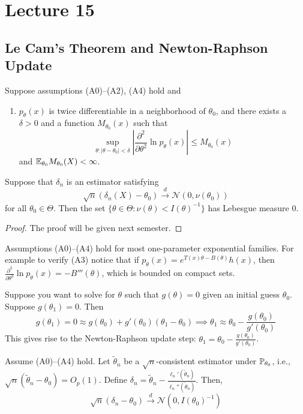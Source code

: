 \section{Lecture 15}

\subsection{Le Cam's Theorem and Newton-Raphson Update}

\begin{theorem}
	Suppose assumptions (A0)--(A2), (A4) hold and
	\begin{enumerate}
		\item[(A3)$''$] $p_\theta(x)$ is twice differentiable in a neighborhood of $\theta_0$, and there exists a $\delta > 0$ and a function $M_{\theta_0}(x)$ such that 
		\[
		\sup_{\theta : |\theta - \theta_0| < \delta} \left| \frac{\partial^2}{\partial \theta^2} \ln p_\theta(x) \right| \leq M_{\theta_0}(x)
		\] 
		and $\mathbb{E}_{\theta_0} M_{\theta_0}(X) < \infty$.
	\end{enumerate}
	Suppose that $\delta_n$ is an estimator satisfying \[
		\sqrt{n}(\delta_n(X) - \theta_0) \overset{d}{\to} \mathcal{N}(0, \nu(\theta_0))
	\] for all $\theta_0 \in \Theta$. Then the set $\{\theta \in \Theta : \nu(\theta) < I(\theta)^{-1} \}$ has Lebesgue measure 0.
\end{theorem}

\begin{proof} The proof will be given next semester.
\end{proof}

\begin{remark}
	Assumptions (A0)--(A4) hold for most one-parameter exponential families. For example to verify (A3) notice that if $p_\theta(x) = e^{T(x)\theta - B(\theta)} h(x)$, then $\frac{\partial^3}{\partial \theta^3} \ln p_\theta(x) = -B'''(\theta)$, which is bounded on compact sets.
\end{remark}

\noindent Suppose you want to solve for $\theta$ such that $g(\theta) = 0$ given an initial guess $\theta_0$. Suppose $g(\theta_1) = 0$. Then \[
	g(\theta_1) = 0 \approx g(\theta_0) + g'(\theta_0) (\theta_1 - \theta_0) \implies \theta_1 \approx \theta_0 - \frac{g(\theta_0)}{g'(\theta_0)}
\]
This gives rise to the Newton-Raphson update step: $\theta_1 = \theta_0 - \frac{g(\theta_0)}{g'(\theta_0)}$.

\begin{theorem}
	Assume (A0)--(A4) hold. Let $\tilde{\theta}_n$ be a $\sqrt{n}$-consistent estimator under $\mathbb{P}_{\theta_0}$, i.e., $\sqrt{n}(\tilde{\theta}_n - \theta_0) = O_p(1)$. Define $\delta_n = \tilde{\theta}_n - \frac{\ell_n'(\tilde{\theta}_n)}{\ell_n''(\tilde{\theta}_n)}$. Then, 
	\[
	\sqrt{n}(\delta_n - \theta_0) \overset{d}{\to} \mathcal{N}(0, I(\theta_0)^{-1})
	\] 
\end{theorem}

